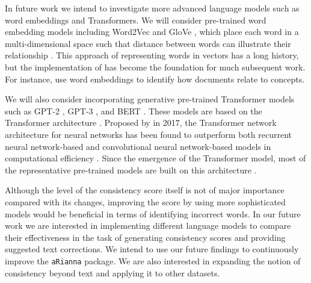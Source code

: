 \documentclass[11pt,]{article}
\begin{document}
In future work we intend to investigate more advanced language models such as word embeddings and Transformers. We will consider pre-trained word embedding models including Word2Vec \citep{mikolov2013efficient} \citep{mikolov2013distributed} and GloVe \citep{pennington2014glove}, which place each word in a multi-dimensional space such that distance between words can illustrate their relationship \citep{bengio2003neural}. This approach of representing words in vectors has a long history, but the implementation of \citet{bengio2003neural} has become the foundation for much subsequent work. For instance, \citet{stoltz2019concept} use word embeddings to identify how documents relate to concepts.

We will also consider incorporating generative pre-trained Transformer models such as GPT-2 \citep{radford2019language}, GPT-3 \citep{brown2020language}, and BERT \citep{devlin2018bert}. These models are based on the Transformer architecture \citep{vaswani2017attention}. Proposed by \citet{vaswani2017attention} in 2017, the Transformer network architecture for neural networks has been found to outperform both recurrent neural network-based and convolutional neural network-based models in computational efficiency \citep{vaswani2017attention}. Since the emergence of the Transformer model, most of the representative pre-trained models are built on this architecture \citep{hanretty2018comparing}.

Although the level of the consistency score itself is not of major importance compared with its changes, improving the score by using more sophisticated models would be beneficial in terms of identifying incorrect words. In our future work we are interested in implementing different language models to compare their effectiveness in the task of generating consistency scores and providing suggested text corrections. We intend to use our future findings to continuously improve the \texttt{aRianna} package. We are also interested in expanding the notion of consistency beyond text and applying it to other datasets.

\newpage





\newpage
\singlespacing 
\renewcommand\refname{References}

\end{document}
